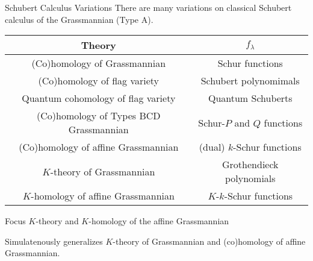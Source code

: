 \documentclass{beamer}
\DeclareMathOperator{\Gr}{Gr}
\theoremstyle{definition}
\begin{document}
\begin{frame}[fragile]{Schubert Calculus Variations}
    There are many variations on classical Schubert calculus of
    the Grassmannian (Type A).
    \pause
    \begin{tabular}{|c|c|}
      \hline
      Theory
      & \(f_\lambda\) \\
      \hline
      (Co)homology of Grassmannian
      & Schur functions\\
      \hline
      (Co)homology of flag variety
      & Schubert polynomimals\\
      \hline
      Quantum cohomology of flag variety
      & Quantum Schuberts\\
      \hline
      (Co)homology of Types BCD Grassmannian
      & Schur-\(P\) and \(Q\) functions\\
      \hline
      (Co)homology of affine Grassmannian
      & (dual) \(k\)-Schur functions\\
      \hline
      \(K\)-theory of Grassmannian
      & Grothendieck polynomials\\
      \hline
      \(K\)-homology of affine Grassmannian
      & \(K\)-\(k\)-Schur functions \\
      \hline
    \end{tabular}
    \pause
  \begin{block}{Focus}
    \(K\)-theory and \(K\)-homology of the affine Grassmannian \pause
  \end{block}
  Simulatenously generalizes \(K\)-theory of Grassmannian and
    (co)homology of affine Grassmannian.
\end{frame}
\end{document}
